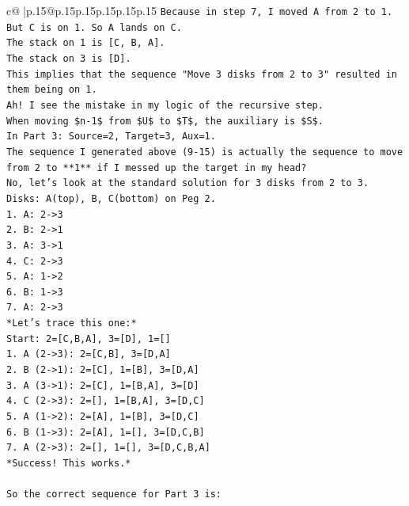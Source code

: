 \documentclass{article}
\begin{document}
{\begin{supertabular}{c@{$\;$}|p{.15\linewidth}@{}p{.15\linewidth}p{.15\linewidth}p{.15\linewidth}p{.15\linewidth}p{.15\linewidth}}
{{{\texttt{Because in step 7, I moved A from 2 to 1. But C is on 1. So A lands on C.} \\
\texttt{The stack on 1 is {[}C, B, A{]}.} \\
\texttt{The stack on 3 is {[}D{]}.} \\
\texttt{This implies that the sequence "Move 3 disks from 2 to 3" resulted in them being on 1.} \\
\texttt{Ah! I see the mistake in my logic of the recursive step.} \\
\texttt{When moving \$n{-}1\$ from \$U\$ to \$T\$, the auxiliary is \$S\$.} \\
\texttt{In Part 3: Source=2, Target=3, Aux=1.} \\
\texttt{The sequence I generated above (9{-}15) is actually the sequence to move from 2 to **1** if I messed up the target in my head?} \\
\texttt{No, let's look at the standard solution for 3 disks from 2 to 3.} \\
\texttt{Disks: A(top), B, C(bottom) on Peg 2.} \\
\texttt{1. A: 2{-}>3} \\
\texttt{2. B: 2{-}>1} \\
\texttt{3. A: 3{-}>1} \\
\texttt{4. C: 2{-}>3} \\
\texttt{5. A: 1{-}>2} \\
\texttt{6. B: 1{-}>3} \\
\texttt{7. A: 2{-}>3} \\
\texttt{*Let's trace this one:*} \\
\texttt{Start: 2={[}C,B,A{]}, 3={[}D{]}, 1={[}{]}} \\
\texttt{1. A (2{-}>3): 2={[}C,B{]}, 3={[}D,A{]}} \\
\texttt{2. B (2{-}>1): 2={[}C{]}, 1={[}B{]}, 3={[}D,A{]}} \\
\texttt{3. A (3{-}>1): 2={[}C{]}, 1={[}B,A{]}, 3={[}D{]}} \\
\texttt{4. C (2{-}>3): 2={[}{]}, 1={[}B,A{]}, 3={[}D,C{]}} \\
\texttt{5. A (1{-}>2): 2={[}A{]}, 1={[}B{]}, 3={[}D,C{]}} \\
\texttt{6. B (1{-}>3): 2={[}A{]}, 1={[}{]}, 3={[}D,C,B{]}} \\
\texttt{7. A (2{-}>3): 2={[}{]}, 1={[}{]}, 3={[}D,C,B,A{]}} \\
\texttt{*Success! This works.*} \\
\\ 
\texttt{So the correct sequence for Part 3 is:} \\
}}}
\end{supertabular}}
\end{document}
